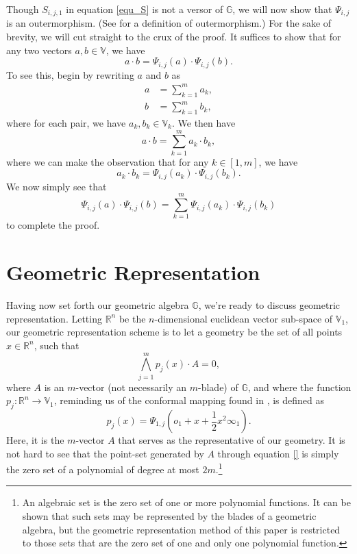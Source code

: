 \documentclass{ecgd-l}
\theoremstyle{definition}
\theoremstyle{remark}
\numberwithin{equation}{section}
\newcommand{\G}{\mathbb{G}}
\newcommand{\V}{\mathbb{V}}
\newcommand{\R}{\mathbb{R}}
\newcommand{\nvai}{\infty}
\newcommand{\nvao}{o}
\begin{document}
Though $S_{i,j,1}$ in equation \eqref{equ_S} is not a versor of $\G$, we will now show that $\Psi_{i,j}$ is an outermorphism.
(See \cite{} for a definition of outermorphism.)  For the sake of brevity, we will cut straight
to the crux of the proof.  It suffices to show that
for any two vectors $a,b\in\V$, we have
\begin{equation*}
a\cdot b = \Psi_{i,j}(a)\cdot \Psi_{i,j}(b).
\end{equation*}
To see this, begin by rewriting $a$ and $b$ as
\begin{align*}
a &= \sum_{k=1}^m a_k, \\
b &= \sum_{k=1}^m b_k,
\end{align*}
where for each pair, we have $a_k,b_k\in\V_k$.  We then have
\begin{equation*}
a\cdot b=\sum_{k=1}^m a_k\cdot b_k,
\end{equation*}
where we can make the observation that for any $k\in[1,m]$, we have
\begin{equation*}
a_k\cdot b_k = \Psi_{i,j}(a_k)\cdot\Psi_{i,j}(b_k).
\end{equation*}
We now simply see that
\begin{equation*}
\Psi_{i,j}(a)\cdot\Psi_{i,j}(b)=\sum_{k=1}^m\Psi_{i,j}(a_k)\cdot\Psi_{i,j}(b_k)
\end{equation*}
to complete the proof.

\section{Geometric Representation}

Having now set forth our geometric algebra $\G$, we're ready to discuss
geometric representation.
Letting $\R^n$ be the $n$-dimensional euclidean vector sub-space
of $\V_1$, our geometric representation scheme is to let a geometry be the
set of all points $x\in\R^n$, such that
\begin{equation*}
\bigwedge_{j=1}^m p_j(x)\cdot A=0,
\end{equation*}
where $A$ is an $m$-vector (not necessarily an $m$-blade) of $\G$, and
where the function $p_j:\R^n\to\V_1$, reminding us of the conformal mapping found in \cite{}, is defined as
\begin{equation*}
p_j(x)=\Psi_{1,j}\left(\nvao_1+x+\frac{1}{2}x^2\nvai_1\right).
\end{equation*}
Here, it is the $m$-vector $A$ that serves as the representative of our geometry.
It is not hard to see that the point-set generated by $A$ through equation \eqref{}
is simply the zero set of a polynomial of degree at most $2m$.\footnote{An algebraic
set is the zero set of one or more polynomial functions.  It can be shown that such sets may be represented by
the blades of a geometric algebra, but the geometric representation method of this paper is restricted to those sets
that are the zero set of one and only one polynomial function.}
\end{document}
